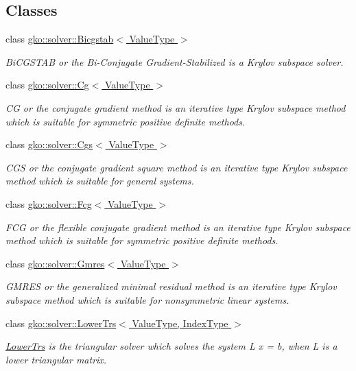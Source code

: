 \subsection*{Classes}
\begin{DoxyCompactItemize}
\item 
class \hyperlink{classgko_1_1solver_1_1Bicgstab}{gko\+::solver\+::\+Bicgstab$<$ Value\+Type $>$}
\begin{DoxyCompactList}\small\item\em Bi\+C\+G\+S\+T\+AB or the Bi-\/\+Conjugate Gradient-\/\+Stabilized is a Krylov subspace solver. \end{DoxyCompactList}\item 
class \hyperlink{classgko_1_1solver_1_1Cg}{gko\+::solver\+::\+Cg$<$ Value\+Type $>$}
\begin{DoxyCompactList}\small\item\em CG or the conjugate gradient method is an iterative type Krylov subspace method which is suitable for symmetric positive definite methods. \end{DoxyCompactList}\item 
class \hyperlink{classgko_1_1solver_1_1Cgs}{gko\+::solver\+::\+Cgs$<$ Value\+Type $>$}
\begin{DoxyCompactList}\small\item\em C\+GS or the conjugate gradient square method is an iterative type Krylov subspace method which is suitable for general systems. \end{DoxyCompactList}\item 
class \hyperlink{classgko_1_1solver_1_1Fcg}{gko\+::solver\+::\+Fcg$<$ Value\+Type $>$}
\begin{DoxyCompactList}\small\item\em F\+CG or the flexible conjugate gradient method is an iterative type Krylov subspace method which is suitable for symmetric positive definite methods. \end{DoxyCompactList}\item 
class \hyperlink{classgko_1_1solver_1_1Gmres}{gko\+::solver\+::\+Gmres$<$ Value\+Type $>$}
\begin{DoxyCompactList}\small\item\em G\+M\+R\+ES or the generalized minimal residual method is an iterative type Krylov subspace method which is suitable for nonsymmetric linear systems. \end{DoxyCompactList}\item 
class \hyperlink{classgko_1_1solver_1_1LowerTrs}{gko\+::solver\+::\+Lower\+Trs$<$ Value\+Type, Index\+Type $>$}
\begin{DoxyCompactList}\small\item\em \hyperlink{classgko_1_1solver_1_1LowerTrs}{Lower\+Trs} is the triangular solver which solves the system L x = b, when L is a lower triangular matrix. \end{DoxyCompactList}\end{DoxyCompactItemize}
